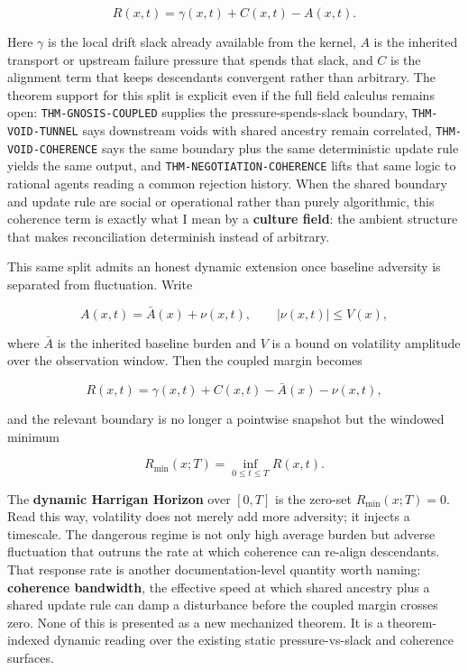 \documentclass[
  11pt,
]{article}
\begin{document}
\[
R(x,t) = \gamma(x,t) + C(x,t) - A(x,t).
\]

Here \(\gamma\) is the local drift slack already available from the
kernel, \(A\) is the inherited transport or upstream failure pressure
that spends that slack, and \(C\) is the alignment term that keeps
descendants convergent rather than arbitrary. The theorem support for
this split is explicit even if the full field calculus remains open:
\texttt{THM-GNOSIS-COUPLED} supplies the pressure-spends-slack boundary,
\texttt{THM-VOID-TUNNEL} says downstream voids with shared ancestry
remain correlated, \texttt{THM-VOID-COHERENCE} says the same boundary
plus the same deterministic update rule yields the same output, and
\texttt{THM-NEGOTIATION-COHERENCE} lifts that same logic to rational
agents reading a common rejection history. When the shared boundary and
update rule are social or operational rather than purely algorithmic,
this coherence term is exactly what I mean by a \textbf{culture field}:
the ambient structure that makes reconciliation determinish instead of
arbitrary.

This same split admits an honest dynamic extension once baseline
adversity is separated from fluctuation. Write

\[
A(x,t) = \bar A(x) + \nu(x,t), \qquad |\nu(x,t)| \le V(x),
\]

where \(\bar A\) is the inherited baseline burden and \(V\) is a bound
on volatility amplitude over the observation window. Then the coupled
margin becomes

\[
R(x,t) = \gamma(x,t) + C(x,t) - \bar A(x) - \nu(x,t),
\]

and the relevant boundary is no longer a pointwise snapshot but the
windowed minimum

\[
R_{\min}(x;T) = \inf_{0 \le t \le T} R(x,t).
\]

The \textbf{dynamic Harrigan Horizon} over \([0,T]\) is the zero-set
\(R_{\min}(x;T) = 0\). Read this way, volatility does not merely add
more adversity; it injects a timescale. The dangerous regime is not only
high average burden but adverse fluctuation that outruns the rate at
which coherence can re-align descendants. That response rate is another
documentation-level quantity worth naming: \textbf{coherence bandwidth},
the effective speed at which shared ancestry plus a shared update rule
can damp a disturbance before the coupled margin crosses zero. None of
this is presented as a new mechanized theorem. It is a theorem-indexed
dynamic reading over the existing static pressure-vs-slack and coherence
surfaces.
\end{document}
